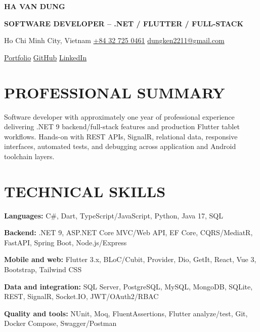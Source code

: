 \documentclass[10pt,a4paper]{article}
\newcommand{\cvlink}[2]{\href{#1}{#2}}
\newcommand{\skillline}[2]{%
  \textbf{\color{muted}#1:} #2\par\vspace{0.6pt}
}
\begin{document}
\begin{center}
  {\fontsize{20}{22}\selectfont\bfseries\color{navy}HA VAN DUNG}\par
  \vspace{1pt}
  {\large\bfseries\color{teal}SOFTWARE DEVELOPER -- .NET / FLUTTER / FULL-STACK}\par
  \vspace{3pt}
  \small
  Ho Chi Minh City, Vietnam \textbar{}
  \href{tel:+84327250461}{+84 32 725 0461} \textbar{}
  \href{mailto:dungken2211@gmail.com}{dungken2211@gmail.com}\par
  \vspace{2pt}
  \cvlink{https://dungken.github.io}{Portfolio} \textbar{}
  \cvlink{https://github.com/dungken}{GitHub} \textbar{}
  \cvlink{https://www.linkedin.com/in/dungdev}{LinkedIn}
\end{center}

\section{PROFESSIONAL SUMMARY}
Software developer with approximately one year of professional experience delivering .NET 9 backend/full-stack features and production Flutter tablet workflows. Hands-on with REST APIs, SignalR, relational data, responsive interfaces, automated tests, and debugging across application and Android toolchain layers.

\section{TECHNICAL SKILLS}
\skillline{Languages}{C\#, Dart, TypeScript/JavaScript, Python, Java 17, SQL}
\skillline{Backend}{.NET 9, ASP.NET Core MVC/Web API, EF Core, CQRS/MediatR, FastAPI, Spring Boot, Node.js/Express}
\skillline{Mobile and web}{Flutter 3.x, BLoC/Cubit, Provider, Dio, GetIt, React, Vue 3, Bootstrap, Tailwind CSS}
\skillline{Data and integration}{SQL Server, PostgreSQL, MySQL, MongoDB, SQLite, REST, SignalR, Socket.IO, JWT/OAuth2/RBAC}
\skillline{Quality and tools}{NUnit, Moq, FluentAssertions, Flutter analyze/test, Git, Docker Compose, Swagger/Postman}
\end{document}
